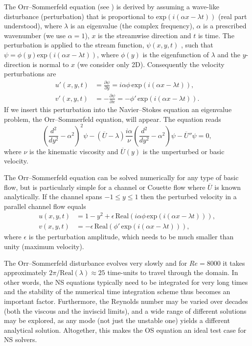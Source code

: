 The Orr--Sommerfeld equation (see \citet{Orzag1971}) is derived by
assuming a wave-like disturbance (perturbation) that is proportional
to $\text{exp}(i(\alpha x-\lambda t))$ (real part understood), where
$\lambda$ is an eigenvalue (the complex frequency), $\alpha$ is a
prescribed wavenumber (we use $\alpha=1$), $x$ is the streamwise
direction and $t$ is time. The perturbation is applied to the stream
function, $\psi(x,y,t)$ , such that $\psi=\phi(y) \text{exp}(i(\alpha
x- \lambda t))$, where $\phi(y)$ is the eigenfunction of $\lambda$ and
the $y$-direction is normal to $x$ (we consider only 2D). Consequently
the velocity perturbations are
\begin{align}
 u'(x,y,t)&=\frac{\partial \psi}{\partial y}=i\alpha \phi \, \text{exp}(i(\alpha x- \lambda t)),
\\
 v'(x,y,t)&=-\frac{\partial \psi}{\partial x}=-\phi' \, \text{exp}(i(\alpha x- \lambda t)).
\end{align}
If we insert this perturbation into the Navier--Stokes equation an
eigenvalue problem, the Orr--Sommerfeld equation, will appear. The
equation reads
\begin{equation}
 \left( \frac{d^2}{dy^2}-\alpha^2\right)^2\psi
      - \left(\overline{U}-\lambda \right) \frac{i \alpha}{\nu}
          \left( \frac{d^2}{dy^2}-\alpha^2\right)\psi - \overline{U}''\psi=0,
 \label{eq:mortensen:OrrS}
\end{equation}
where $\nu$ is the kinematic viscosity and $\overline{U}(y)$ is the
unperturbed or basic velocity.

The Orr--Sommerfeld equation can be solved numerically for any type of
basic flow, but is particularly simple for a channel or Couette flow
where $\overline{U}$ is known analytically. If the channel spans
$-1\leqslant y \leqslant 1$ then the perturbed velocity in a parallel
channel flow equals
\begin{equation}
\begin{split}
 u(x,y,t)&=1-y^2+\epsilon \,\text{Real}\left(i\alpha \phi \, \text{exp}(i(\alpha x-\lambda t))\right),
\\
 v(x,y,t)&=-\epsilon \, \text{Real}\left(\phi' \, \text{exp}(i(\alpha x-\lambda t))\right),
\end{split}
\label{eq:mortensen:channel}
\end{equation}
where $\epsilon$ is the perturbation amplitude, which needs to be much
smaller than unity (maximum velocity).

The Orr--Sommerfeld disturbance evolves very slowly and for $Re=8000$ it
takes approximately $2 \pi/\text{Real}(\lambda)\approx 25$ time-units to
travel through the domain. In other words, the NS equations typically need
to be integrated for very long times and the stability of the numerical
time integration scheme thus becomes an important factor. Furthermore,
the Reynolds number may be varied over decades (both the viscous and
the inviscid limits), and a wide range of different solutions may be
explored, as any mode (not just the unstable one) yields a different
analytical solution. Altogether, this makes the OS equation an ideal
test case for NS solvers.

